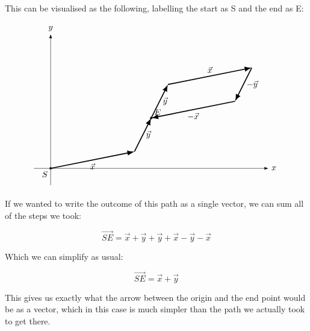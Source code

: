 This can be visualised as the following, labelling the start as S and the end as E:


\[
\begin{tikzpicture}[scale=0.7, >=Latex]

    \draw[->] (-1,0) -- (13,0) node[right] {$x$};
    \draw[->] (0,-1) -- (0,8) node[above] {$y$};

    \coordinate (O) at (0,0);
    \coordinate (A) at (5,1);   %
    \coordinate (B) at (6,3);   %
    \coordinate (C) at (7,5);   %
    \coordinate (D) at (12,6);  %
    \coordinate (E) at (11,4);  %
    \coordinate (F) at (6,3);   %

    \draw[very thick,->] (O) -- (A) node[midway, below] {$\vec{x}$};
    \draw[very thick,->] (A) -- (B) node[midway, right] {$\vec{y}$};
    \draw[very thick,->] (B) -- (C) node[midway, right] {$\vec{y}$};
    \draw[very thick,->] (C) -- (D) node[midway, above] {$\vec{x}$};
    \draw[very thick,->] (D) -- (E) node[midway, right] {$-\vec{y}$};
    \draw[very thick,->] (E) -- (F) node[midway, below] {$-\vec{x}$};

    \fill (O) circle (2pt);
    \fill (F) circle (2pt);

    \node[below left] at (O) {$S$};
    \node[above right] at (F) {$E$};

\end{tikzpicture}
\]

If we wanted to write the outcome of this path as a single vector, we can sum all of the steps we took:

\[ \vec{SE} = \vec{x} + \vec{y} + \vec{y} + \vec{x} - \vec{y} - \vec{x}
\]

Which we can simplify as usual:

\[\vec{SE} =  \vec{x} + \vec{y} \]

This gives us exactly what the arrow between the origin and the end point would be as a vector, which in this case is much simpler than the path we actually took to get there.

